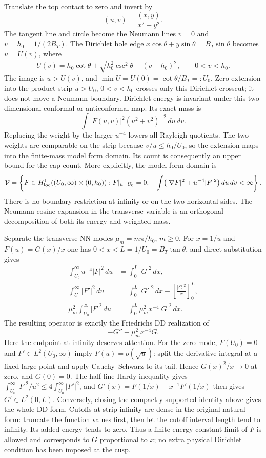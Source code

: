 \documentclass[11pt,reqno]{amsart}
\numberwithin{equation}{section}
\begin{document}
Translate the top contact to zero and invert by
\[
 (u,v)=\frac{(x,y)}{x^2+y^2}.
\]
The tangent line and circle become the Neumann lines $v=0$ and
$v=h_0=1/(2B_T)$.  The Dirichlet hole edge
$x\cos\theta+y\sin\theta=B_T\sin\theta$ becomes $u=U(v)$, where
\[
 U(v)=h_0\cot\theta+
        \sqrt{h_0^2\csc^2\theta-(v-h_0)^2},\qquad0<v<h_0.
\]
The image is $u>U(v)$, and $\min U=U(0)=\cot\theta/B_T=:U_0$.
Zero extension into the product strip
$u>U_0$, $0<v<h_0$ crosses only this Dirichlet crosscut; it does not
move a Neumann boundary.  Dirichlet energy is invariant under this
two-dimensional conformal or anticonformal map.  Its exact mass is
\[
 \int |F(u,v)|^2(u^2+v^2)^{-2}\,du\,dv.
\]
Replacing the weight by the larger $u^{-4}$ lowers all Rayleigh
quotients.  The two weights are comparable on the strip because
$v/u\le h_0/U_0$, so the extension maps into the finite-mass model
form domain.  Its count is consequently an upper bound for the cap count.
More explicitly, the model form domain is
\[
 \mathcal V=\left\{F\in H^1_{\rm loc}((U_0,\infty)\times(0,h_0)):
 F|_{u=U_0}=0,\quad
 \int\bigl(|\nabla F|^2+u^{-4}|F|^2\bigr)\,du\,dv<\infty\right\}.
\]
There is no boundary restriction at infinity or on the two horizontal
sides.  The Neumann cosine expansion in the transverse variable is an
orthogonal decomposition of both its energy and weighted mass.

Separate the transverse NN modes $\mu_m=m\pi/h_0$, $m\ge0$.
For $x=1/u$ and $F(u)=G(x)/x$ one has $0<x<L=1/U_0=B_T\tan\theta$,
and direct substitution gives
\begin{align*}
 \int_{U_0}^{\infty}u^{-4}|F|^2\,du&=\int_0^L|G|^2\,dx,\\
 \int_{U_0}^{\infty}|F'|^2\,du
       &=\int_0^L|G'|^2\,dx-\left[\frac{|G|^2}{x}\right]_0^L,\\
 \mu_m^2\int_{U_0}^{\infty}|F|^2\,du
       &=\int_0^L\mu_m^2x^{-4}|G|^2\,dx.
\end{align*}
The resulting operator is exactly the Friedrichs DD realization of
\begin{equation}\label{geo:kelvin-operator}
 -G''+\mu_m^2x^{-4}G.
\end{equation}
Here the endpoint at infinity deserves attention.  For the zero mode,
$F(U_0)=0$ and $F'\in L^2(U_0,\infty)$ imply $F(u)=o(\sqrt u)$:
split the derivative integral at a fixed large point and apply
Cauchy--Schwarz to its tail.  Hence $G(x)^2/x\to0$ at zero, and
$G(0)=0$.  The half-line Hardy inequality gives
$\int_{U_0}^{\infty}|F|^2/u^2\le4\int_{U_0}^{\infty}|F'|^2$,
and $G'(x)=F(1/x)-x^{-1}F'(1/x)$ then gives $G'\in L^2(0,L)$.
Conversely, closing the compactly supported identity above gives the
whole DD form.  Cutoffs at strip infinity are dense in the original
natural form: truncate the function values first, then let the cutoff
interval length tend to infinity.  Its added energy tends to zero.
Thus a finite-energy constant limit of $F$ is allowed and corresponds
to $G$ proportional to $x$; no extra physical Dirichlet condition has
been imposed at the cusp.
\end{document}
